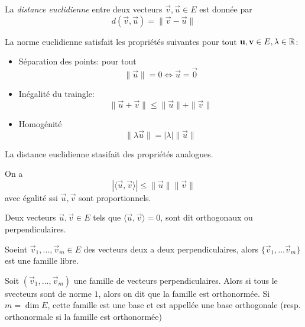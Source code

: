 \begin{definition}
	La \emph{distance euclidienne} entre deux vecteurs $\vec{v}, \vec{u} \in E$
	est donnée par
	\begin{equation*}
		d(\vec{v}, \vec{u}) = \|\vec{v}-\vec{u}\|
	\end{equation*}
\end{definition}

\begin{theorem}
	La norme euclidienne satisfait les propriétés suivantes
	pour tout $\mathbf{u}, \mathbf{v} \in E, \lambda \in \mathbb{R}$:
	\begin{itemize}
		\item Séparation des points: pour tout
			\begin{equation*}
				\|\vec{u}\| = 0 \iff \vec{u} = \vec{0}
			\end{equation*}
		\item Inégalité du traingle:
			\begin{equation*}
				\|\vec{u} + \vec{v}\| \leq \|\vec{u}\| + \|\vec{v}\|
			\end{equation*}
		\item Homogénité
			\begin{equation*}
				\|\lambda\vec{u}\| = |\lambda|\|\vec{u}\|
			\end{equation*}
	\end{itemize}
	La distance euclidienne stasifait des propriétés analogues.
\end{theorem}

\begin{proposition}
	On a 
	\begin{equation*}
		|\langle \vec{u}, \vec{v}\rangle| \leq \|\vec{u}\|\|\vec{v}\|
	\end{equation*}
	avec égalité ssi $\vec{u}, \vec{v}$ sont proportionnels.
\end{proposition}

\begin{definition}
	Deux vecteurs $\vec{u}, \vec{v} \in E$ tels que $\langle \vec{u}, \vec{v}
	\rangle = 0$, sont dit orthogonaux ou perpendiculaires.
\end{definition}

\begin{proposition}
	Soeint $\vec{v}_1, \dots, \vec{v}_m \in E$ des vecteurs deux a deux
	perpendiculaires, alors $\{\vec{v}_1, \dots \vec{v}_m\}$ est une famille
	libre.
\end{proposition}

\begin{definition}
	Soit $(\vec{v}_1, \dots, \vec{v}_m)$ une famille de vecteurs
	perpendiculaires. Alors si tous le svecteurs sont de norme $1$, alors on dit
	que la famille est orthonormée. Si $m = \dim E$, cette famille est
	une base et est appellée une base orthogonale (resp. orthonormale si la
	famille est orthonormée)
\end{definition}

